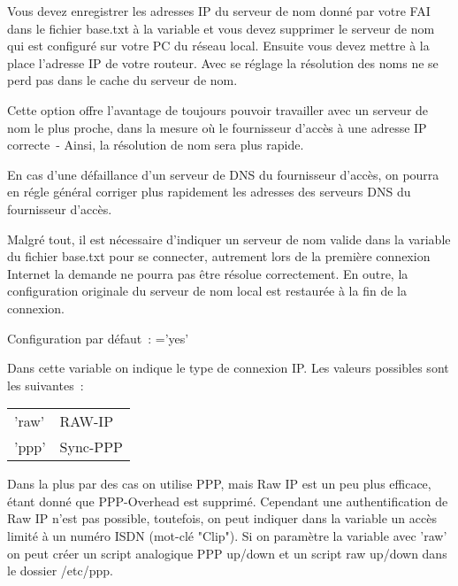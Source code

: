 \begin{description}
  Vous devez enregistrer les adresses IP du serveur de nom donné par votre FAI
  dans le fichier base.txt à la variable \emph{} et vous
  devez supprimer le serveur de nom qui est configuré sur votre PC du réseau
  local. Ensuite vous devez mettre à la place l'adresse IP de votre routeur. Avec
  se réglage la résolution des noms ne se perd pas dans le cache du serveur de nom.

  Cette option offre l'avantage de toujours pouvoir travailler avec un serveur de
  nom le plus proche, dans la mesure où le fournisseur d'accès à une adresse IP
  correcte~- Ainsi, la résolution de nom sera plus rapide.

  En cas d'une défaillance d'un serveur de DNS du fournisseur d'accès, on pourra
  en régle général corriger plus rapidement les adresses des serveurs DNS du
  fournisseur d'accès.

  Malgré tout, il est nécessaire d'indiquer un serveur de nom valide dans la
  variable \emph{} du fichier base.txt pour se connecter,
  autrement lors de la première connexion Internet la demande ne pourra pas être
  résolue correctement. En outre, la configuration originale du serveur de nom
  local est restaurée à la fin de la connexion.

  Configuration par défaut~: ='yes'


  Dans cette variable  on indique le type de
  connexion IP. Les valeurs possibles sont les suivantes~:

  \begin{tabular}[h!]{ll}
        'raw' &           RAW-IP\\
        'ppp' &           Sync-PPP\\
  \end{tabular}

  Dans la plus par des cas on utilise PPP, mais Raw IP est un peu plus efficace,
  étant donné que PPP-Overhead est supprimé. Cependant une authentification de
  Raw IP n'est pas possible, toutefois, on peut indiquer dans la variable
   un accès limité à un numéro ISDN (mot-clé "Clip").
  Si on paramètre la variable  avec 'raw' on peut
  créer un script analogique PPP up/down et un script raw up/down dans le dossier /etc/ppp.



\end{description}
